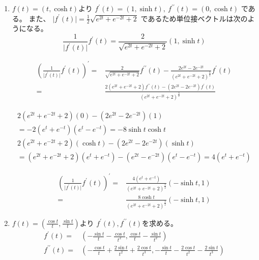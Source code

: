 \documentclass[12pt,b5paper]{ltjsarticle}
\begin{document}
\begin{enumerate}
\begin{enumerate}
 \item
      $f(t)=(t, \cosh t)$より
      $f^{\prime}(t) = (1,\sinh t),\ f^{\prime\prime}(t) = (0,\cosh t)$
      である。
      また、
      $\lvert f^{\prime}(t) \rvert = \frac{1}{2}\sqrt{e^{2t}+e^{-2t}+2}$
      であるため単位接ベクトルは次のようになる。
      \begin{equation}
       \frac{1}{\lvert f^{\prime}(t) \rvert}f^{\prime}(t)=
         \frac{2}{\sqrt{e^{2t}+e^{-2t}+2}}(1,\sinh t)
      \end{equation}

      \begin{align}
        \left( \frac{1}{\lvert f^{\prime}(t) \rvert}f^{\prime}(t) \right)^{\prime}
       =& \frac{2}{\sqrt{e^{2t}+e^{-2t}+2}} f^{\prime\prime}(t)
       - \frac{2e^{2t}-2e^{-2t}}{(e^{2t}+e^{-2t}+2)^{\frac{3}{2}}} f^{\prime}(t)\\
       =& \frac{2(e^{2t}+e^{-2t}+2)f^{\prime\prime}(t)-(2e^{2t}-2e^{-2t})f^{\prime}(t)}{(e^{2t}+e^{-2t}+2)^{\frac{3}{2}}}
      \end{align}

      \begin{gather}
       2(e^{2t}+e^{-2t}+2)(0)-(2e^{2t}-2e^{-2t})(1)\\
       = -2(e^{t}+e^{-t})(e^{t}-e^{-t})=-8\sinh t \cosh t\\
       2(e^{2t}+e^{-2t}+2)(\cosh t)-(2e^{2t}-2e^{-2t})(\sinh t)\\
       = (e^{2t}+e^{-2t}+2)(e^{t}+e^{-t})-(e^{2t}-e^{-2t})(e^{t}-e^{-t}) = 4(e^{t}+e^{-t})
      \end{gather}

      \begin{align}
       \left( \frac{1}{\lvert f^{\prime}(t) \rvert}f^{\prime}(t) \right)^{\prime}=&
        \frac{4(e^{t}+e^{-t})}{(e^{2t}+e^{-2t}+2)^{\frac{3}{2}}}(-\sinh t,1)\\
       =&
        \frac{8\cosh t}{(e^{2t}+e^{-2t}+2)^{\frac{3}{2}}}(-\sinh t,1)
      \end{align}



 \item
      $f(t)=(\frac{\cos t}{t}, \frac{\sin t}{t})$より
      $f^{\prime}(t), f^{\prime\prime}(t)$を求める。
      \begin{align}
       f^{\prime}(t)=&
       \left(
         -\frac{\sin t}{t}-\frac{\cos t}{t^2},
         \frac{\cos t}{t}-\frac{\sin t}{t^2}
       \right)\\
       f^{\prime\prime}(t)=&
       \left(
       -\frac{\cos t}{t}+\frac{2\sin t}{t^2}+\frac{2\cos t}{t^3},
       -\frac{\sin t}{t}-\frac{2\cos t}{t^2}-\frac{2\sin t}{t^3}
       \right)
      \end{align}
\end{enumerate}





\end{enumerate}
\end{document}
